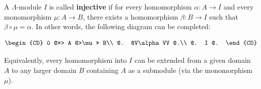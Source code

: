 A $\Lambda$-module $I$ is called \textbf{injective} if for every homomorphism $\alpha : A \rightarrow I$ and every monomorphism $\mu : A \rightarrow B$, there exists a homomorphism $\beta : B \rightarrow I$ such that $\beta \circ \mu = \alpha$. In other words, the following diagram can be completed:

\[
\begin{CD}
0 @>>> A @>\mu>> B\\
@. @V\alpha VV @.\\
@. I @.
\end{CD}
\]

Equivalently, every homomorphism into $I$ can be extended from a given domain $A$ to any larger domain $B$ containing $A$ as a submodule (via the monomorphism $\mu$).

